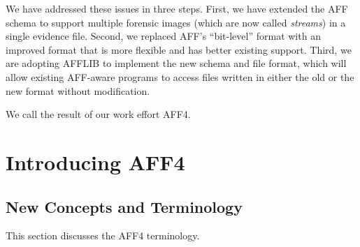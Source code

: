 \documentclass[10pt, conference]{IEEEtran}
\begin{document}
We have addressed these issues in three steps. First, we have extended
the AFF schema to support multiple forensic images (which are now
called \emph{streams}) in a single evidence file. Second, we replaced
AFF's ``bit-level'' format with an improved format that is more
flexible and has better existing support. Third, we are adopting
AFFLIB to implement the new schema and file format, which will allow
existing AFF-aware programs to access files written in either the old
or the new format without modification.

We call the result of our work effort AFF4.

\section{Introducing AFF4}


\subsection{New Concepts and Terminology}

This section discusses the AFF4 terminology. 
\end{document}
